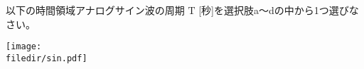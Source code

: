 以下の時間領域アナログサイン波の周期 $\textrm{T}$ [秒]を選択肢a〜dの中から1つ選びなさい。

\centering\texttt{[image: \\filedir/sin.pdf]}
